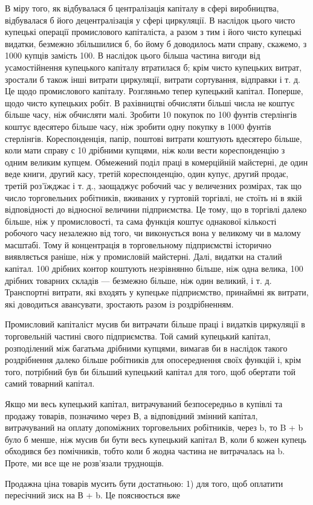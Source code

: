 \parcont{}  %
В міру того, як відбувалася б централізація капіталу в сфері
виробництва, відбувалася б його децентралізація у сфері циркуляції.
В наслідок цього чисто купецькі операції промислового
капіталіста, а разом з тим і його чисто купецькі видатки, безмежно
збільшилися б, бо йому б доводилось мати справу, скажемо,
з 1000 купців замість 100. В наслідок цього більша частина
вигоди від усамостійнення купецького капіталу втратилася б;
крім чисто купецьких витрат, зростали б також інші витрати
циркуляції, витрати сортування, відправки і т. д. Це щодо промислового
капіталу. Розгляньмо тепер купецький капітал. Поперше,
щодо чисто купецьких робіт. В рахівництві обчисляти
більші числа не коштує більше часу, ніж обчисляти малі. Зробити
10 покупок по 100 фунтів стерлінгів коштує вдесятеро більше
часу, ніж зробити одну покупку в 1000 фунтів стерлінгів. Кореспонденція,
папір, поштові витрати коштують вдесятеро більше,
коли мати справу с 10 дрібними купцями, ніж коли вести кореспонденцію
з одним великим купцем. Обмежений поділ праці в комерційній
майстерні, де один веде книги, другий касу, третій
кореспонденцію, один купує, другий продає, третій роз’їжджає
і т. д., заощаджує робочий час у величезних розмірах, так що
число торговельних робітників, вживаних у гуртовій торгівлі,
не стоїть ні в якій відповідності до відносної величини підприємства.
Це тому, що в торгівлі далеко більше, ніж у промисловості,
та сама функція коштує однакової кількості робочого часу
незалежно від того, чи виконується вона у великому чи в малому
масштабі. Тому й концентрація в торговельному підприємстві
історично виявляється раніше, ніж у промисловій майстерні.
Далі, видатки на сталий капітал. 100 дрібних контор коштують
незрівнянно більше, ніж одна велика, 100 дрібних товарних складів
— безмежно більше, ніж один великий, і т. д. Транспортні витрати,
які входять у купецьке підприємство, принаймні як витрати,
які доводиться авансувати, зростають разом із роздрібненням.

Промисловий капіталіст мусив би витрачати більше праці
і видатків циркуляції в торговельній частині свого підприємства.
Той самий купецький капітал, розподілений між багатьма дрібними
купцями, вимагав би в наслідок такого роздрібнення далеко
більше робітників для опосереднення своїх функцій і, крім
того, потрібний був би більший купецький капітал для того,
щоб обертати той самий товарний капітал.

Якщо ми весь купецький капітал, витрачуваний безпосередньо
в купівлі та продажу товарів, позначимо через В, а відповідний
змінний капітал, витрачуваний на оплату допоміжних торговельних
робітників, через b, то B + b було б менше, ніж мусив би
бути весь купецький капітал В, коли б кожен купець обходився
без помічників, тобто коли б жодна частина не витрачалась на b.
Проте, ми все ще не розв’язали труднощів.

Продажна ціна товарів мусить бути достатньою: 1) для того,
щоб оплатити пересічний зиск на В + b. Це пояснюється вже
\parbreak{}  %
